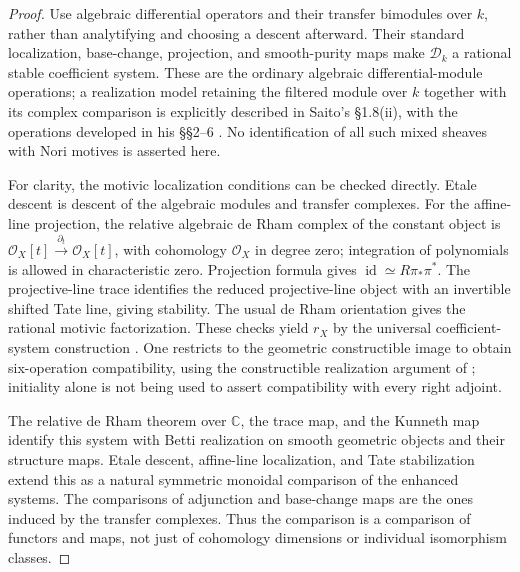 \documentclass[11pt]{article}
\numberwithin{equation}{section}
\theoremstyle{definition}
\theoremstyle{remark}
\newcommand{\C}{\mathbb C}
\newcommand{\Ocal}{\mathcal O}
\newcommand{\id}{\operatorname{id}}
\begin{document}
\begin{proof}
Use algebraic differential operators and their transfer bimodules over
$k$, rather than analytifying and choosing a descent afterward. Their
standard localization, base-change, projection, and smooth-purity maps
make $\mathscr D_k$ a rational stable coefficient system. These are the
ordinary algebraic differential-module operations; a realization model
retaining the filtered module over $k$ together with its complex
comparison is explicitly described in Saito's \S1.8(ii), with the
operations developed in his \S\S2--6 \cite{SaitoMixed}. No identification
of all such mixed sheaves with Nori motives is asserted here.

For clarity, the motivic localization conditions can be checked directly.
Etale descent is descent of the algebraic modules and transfer complexes.
For the affine-line projection, the relative algebraic de Rham complex of
the constant object is $\Ocal_X[t]\xrightarrow{\partial_t}
\Ocal_X[t]$, with cohomology $\Ocal_X$ in degree zero; integration of
polynomials is allowed in characteristic zero. Projection formula gives
$\id\simeq R\pi_*\pi^*$. The projective-line trace identifies the
reduced projective-line object with an invertible shifted Tate line, giving
stability. The usual de Rham orientation gives the rational motivic
factorization. These checks yield $r_X$ by the universal coefficient-system
construction \cite[Theorem~7.14]{DrewGallauer}. One restricts to the
geometric constructible image to obtain six-operation compatibility,
using the constructible realization argument of
\cite[Theorem~4.5 and its proof]{Tubach}; initiality alone is not being
used to assert compatibility with every right adjoint.

The relative de Rham theorem over $\C$, the trace map, and the Kunneth
map identify this system with Betti realization on smooth geometric
objects and their structure maps. Etale descent, affine-line localization,
and Tate stabilization extend this as a natural symmetric monoidal
comparison of the enhanced systems. The comparisons of adjunction and
base-change maps are the ones induced by the transfer complexes. Thus the
comparison is a comparison of functors and maps, not just of cohomology
dimensions or individual isomorphism classes.
\end{proof}
\end{document}
